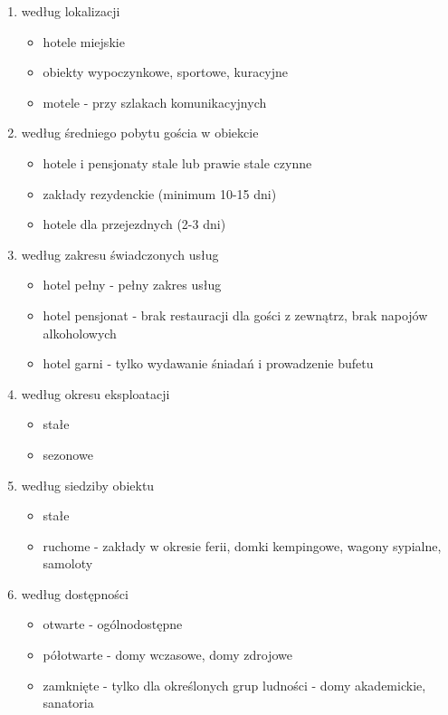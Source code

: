 \documentclass[a4paper,onecolumn,oneside,11pt,wide,floatssmall]{mwrep}
\theoremstyle{definition}
\theoremstyle{plain}%
\theoremstyle{remark}
\begin{document}
\begin{enumerate}
  \item według lokalizacji
    \begin{itemize}
      \item hotele miejskie
      \item obiekty wypoczynkowe, sportowe, kuracyjne
      \item motele - przy szlakach komunikacyjnych
    \end{itemize}
  \item według średniego pobytu gościa w obiekcie
    \begin{itemize}
      \item hotele i pensjonaty stale lub prawie stale czynne
      \item zakłady rezydenckie (minimum 10-15 dni)
      \item hotele dla przejezdnych (2-3 dni)
    \end{itemize}
  \item według zakresu świadczonych usług
    \begin{itemize}
      \item hotel pełny - pełny zakres usług
      \item hotel pensjonat - brak restauracji dla gości z zewnątrz, brak 
      napojów alkoholowych
      \item hotel garni - tylko wydawanie śniadań i prowadzenie bufetu
    \end{itemize}
  \item według okresu eksploatacji
    \begin{itemize}
      \item stałe
      \item sezonowe
    \end{itemize}
  \item według siedziby obiektu
    \begin{itemize}
      \item stałe
      \item ruchome - zakłady w okresie ferii, domki kempingowe, wagony 
      sypialne, samoloty
    \end{itemize}
  \item według dostępności
    \begin{itemize}
      \item otwarte - ogólnodostępne
      \item półotwarte - domy wczasowe, domy zdrojowe
      \item zamknięte - tylko dla określonych grup ludności - domy 
      akademickie, sanatoria
    \end{itemize}
\end{enumerate}
\end{document}
